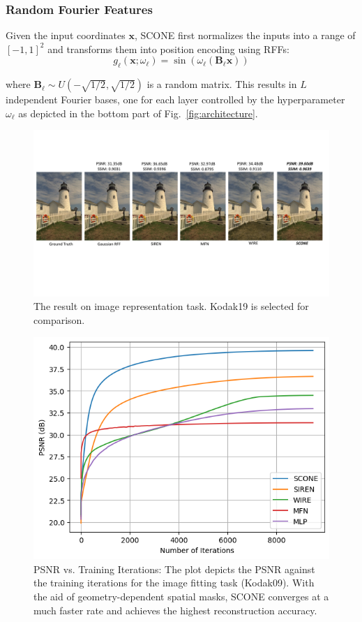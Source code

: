 \documentclass[letterpaper]{article} %
\begin{document}
\subsubsection{Random Fourier Features}
\label{subsubsec:method_rff}
Given the input coordinates $\mathbf{x}$, SCONE first normalizes the inputs into a range of $[-1, 1]^2$ and transforms them into position encoding using RFFs:
\begin{equation}
    g_{\ell}(\mathbf{x};\omega_{\ell}) = \sin(\omega_{\ell}(\mathbf{B_{\ell}x}))
\end{equation}

\noindent where $\mathbf{B_{\ell}}\sim U(-\sqrt{1/2}, \sqrt{1/2})$ is a random matrix. This results in $L$ independent Fourier bases, one for each layer controlled by the hyperparameter $\omega_{\ell}$ as depicted in the bottom part of Fig.~\ref{fig:architecture}.


\begin{figure}[th]
    \centering
    \includegraphics[width=2\columnwidth]{Figures/image_fitting.pdf}
    \caption{The result on image representation task. Kodak19 is selected for comparison.}
    \label{fig:2d_results}
\end{figure}

\begin{figure}[ht]
    \centering
    \includegraphics[width=0.9\columnwidth]{Figures/psnr_vs_iters.png}
    \caption{PSNR vs. Training Iterations: The plot depicts the PSNR against the training iterations for the image fitting task (Kodak09). With the aid of geometry-dependent spatial masks, SCONE converges at a much faster rate and achieves the highest reconstruction accuracy.}
    \label{fig:psnr_vs_iters}
\end{figure}
\end{document}

